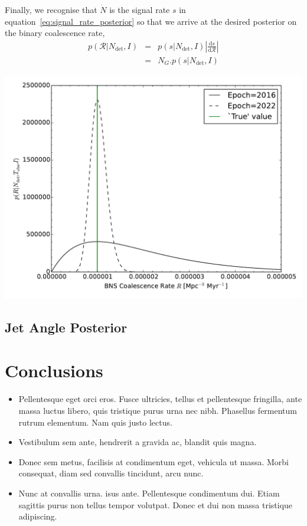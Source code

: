\documentclass[a0,landscape]{a0poster}
\newcommand{\cbcrate}{{{\mathcal R}}}
\newcommand{\diff}{{\mathrm d}}
\begin{document}
\begin{multicols}{4}
Finally, we recognise that $\dot{N}$ is the signal rate $s$ in
equation~\ref{eq:signal_rate_posterior} so that we arrive at the desired
posterior on the binary coalescence rate, 
%
\begin{eqnarray}
p(\cbcrate|N_{\textrm{det}},I) & = & p(s|N_{\textrm{det}},I) \left|\frac{\diff
s}{\diff \cbcrate}\right| \\
& = & N_G . p(s|N_{\textrm{det}},I)
\end{eqnarray}

\begin{center}\vspace{1cm}
    \includegraphics[width=0.5\linewidth]{rate_re.pdf}
\end{center}\vspace{1cm}

\subsection*{Jet Angle Posterior}


\color{SaddleBrown} %

\section*{Conclusions}

\begin{itemize}
\item Pellentesque eget orci eros. Fusce ultricies, tellus et pellentesque fringilla, ante massa luctus libero, quis tristique purus urna nec nibh. Phasellus fermentum rutrum elementum. Nam quis justo lectus.
\item Vestibulum sem ante, hendrerit a gravida ac, blandit quis magna.
\item Donec sem metus, facilisis at condimentum eget, vehicula ut massa. Morbi consequat, diam sed convallis tincidunt, arcu nunc.
\item Nunc at convallis urna. isus ante. Pellentesque condimentum dui. Etiam sagittis purus non tellus tempor volutpat. Donec et dui non massa tristique adipiscing.
\end{itemize}


\end{multicols}
\end{document}
